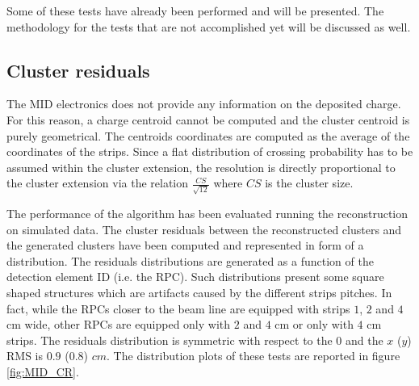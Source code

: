 Some of these tests have already been performed and will be presented.
The methodology for the tests that are not accomplished yet will be discussed as well.

\subsection{Cluster residuals}

The MID electronics does not provide any information on the deposited charge. 
For this reason, a charge centroid cannot be computed and the cluster centroid is purely geometrical.
The centroids coordinates are computed as the average of the coordinates of the strips.
Since a flat distribution of crossing probability has to be assumed within the cluster extension, the resolution is directly proportional to the cluster extension via the relation $\frac{CS}{\sqrt{12}}$ where $CS$ is the cluster size.

The performance of the algorithm has been evaluated running the reconstruction on simulated data.
The cluster residuals between the reconstructed clusters and the generated clusters have been computed and represented in form of a distribution.
The residuals distributions are generated as a function of the detection element ID (i.e. the RPC).
Such distributions present some square shaped structures which are artifacts caused by the different strips pitches.
In fact, while the RPCs closer to the beam line are equipped with strips $1$, $2$ and $4$ cm wide, other RPCs are equipped only with $2$ and $4$ cm or only with $4$ cm strips.
The residuals distribution is symmetric with respect to the $0$ and the $x$ ($y$) RMS is $0.9$ ($0.8$) $cm$.
The distribution plots of these tests are reported in figure \ref{fig:MID_CR}.

